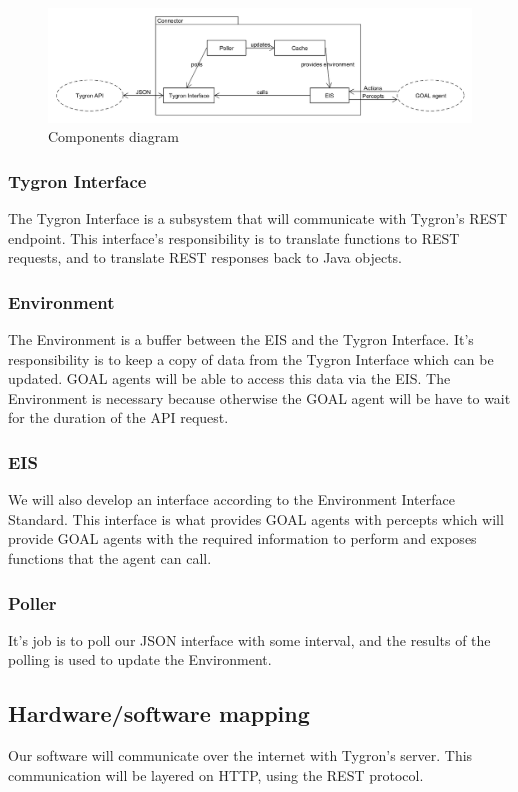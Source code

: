 \documentclass[a4paper]{article}
\begin{document}
\begin{figure}[h!]
  \caption{Components diagram}
  \centering
    \includegraphics[width=1.0\textwidth]{components diagram.png}
\end{figure}

\subsubsection{Tygron Interface}
The Tygron Interface is a subsystem that will communicate with Tygron’s REST endpoint. This interface’s responsibility is to translate functions to REST requests, and to translate REST responses back to Java objects.

\subsubsection{Environment}
The Environment is a buffer between the EIS and the Tygron Interface. It’s responsibility is to keep a copy of data from the Tygron Interface which can be updated. GOAL agents will be able to access this data via the EIS. The Environment is necessary because otherwise the GOAL agent will be have to wait for the duration of the API request.

\subsubsection{EIS}
We will also develop an interface according to the Environment Interface Standard. This interface is what provides GOAL agents with percepts which will provide GOAL agents with the required information to perform and exposes functions that the agent can call.

\subsubsection{Poller}
It’s job is to poll our JSON interface with some interval, and the results of the polling is used to update the Environment. 

\subsection{Hardware/software mapping}
Our software will communicate over the internet with Tygron’s server. This communication will be layered on HTTP, using the REST protocol.
\end{document}
